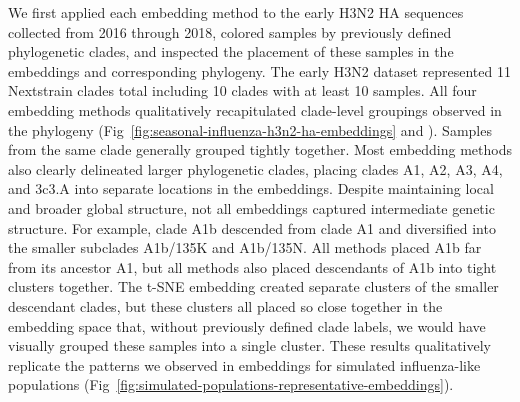 \documentclass[10pt,letterpaper]{article}
\begin{document}
We first applied each embedding method to the early H3N2 HA sequences collected from 2016 through 2018, colored samples by previously defined phylogenetic clades, and inspected the placement of these samples in the embeddings and corresponding phylogeny.
The early H3N2 dataset represented 11 Nextstrain clades total including 10 clades with at least 10 samples.
All four embedding methods qualitatively recapitulated clade-level groupings observed in the phylogeny (Fig~\ref{fig:seasonal-influenza-h3n2-ha-embeddings} and ).
Samples from the same clade generally grouped tightly together.
Most embedding methods also clearly delineated larger phylogenetic clades, placing clades A1, A2, A3, A4, and 3c3.A into separate locations in the embeddings.
Despite maintaining local and broader global structure, not all embeddings captured intermediate genetic structure.
For example, clade A1b descended from clade A1 and diversified into the smaller subclades A1b/135K and A1b/135N.
All methods placed A1b far from its ancestor A1, but all methods also placed descendants of A1b into tight clusters together.
The t-SNE embedding created separate clusters of the smaller descendant clades, but these clusters all placed so close together in the embedding space that, without previously defined clade labels, we would have visually grouped these samples into a single cluster.
These results qualitatively replicate the patterns we observed in embeddings for simulated influenza-like populations (Fig~\ref{fig:simulated-populations-representative-embeddings}).

\end{document}
